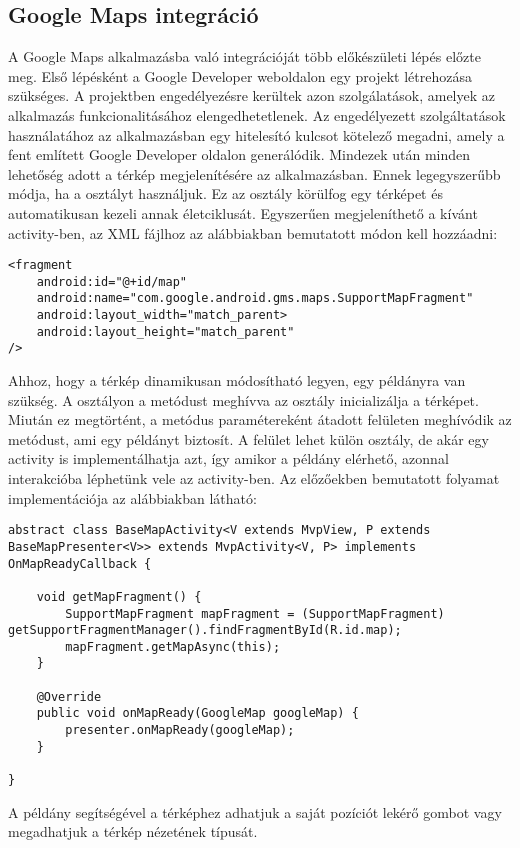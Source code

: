 \subsection*{Google Maps integráció}
\label{googlemaps}
A Google Maps alkalmazásba való integrációját több előkészületi lépés előzte meg.
Első lépésként a Google Developer weboldalon egy projekt létrehozása szükséges.
A projektben engedélyezésre kerültek azon szolgálatások, amelyek az alkalmazás funkcionalitásához elengedhetetlenek.
Az engedélyezett szolgáltatások használatához az alkalmazásban egy hitelesító kulcsot kötelező megadni, amely a fent említett Google Developer oldalon generálódik. 
Mindezek után minden lehetőség adott a térkép megjelenítésére az alkalmazásban.
Ennek legegyszerűbb módja, ha a  osztályt használjuk.
Ez az osztály körülfog egy térképet és automatikusan kezeli annak életciklusát.
Egyszerűen megjeleníthető a kívánt activity-ben, az XML fájlhoz az alábbiakban bemutatott módon kell hozzáadni:
\begin{lstlisting}
<fragment
	android:id="@+id/map"
	android:name="com.google.android.gms.maps.SupportMapFragment"
	android:layout_width="match_parent>
	android:layout_height="match_parent"
/>
\end{lstlisting}

Ahhoz, hogy a térkép dinamikusan módosítható legyen, egy  példányra van szükség.
A  osztályon a  metódust meghívva az osztály inicializálja a térképet.
Miután ez megtörtént, a metódus paramétereként átadott  felületen meghívódik az  metódust, ami egy  példányt biztosít.
A  felület lehet külön osztály, de akár egy activity is implementálhatja azt, így amikor a példány elérhető, azonnal interakcióba léphetünk vele az activity-ben.
Az előzőekben bemutatott folyamat implementációja az alábbiakban látható:
\begin{lstlisting}
abstract class BaseMapActivity<V extends MvpView, P extends BaseMapPresenter<V>> extends MvpActivity<V, P> implements OnMapReadyCallback {

    void getMapFragment() {
        SupportMapFragment mapFragment = (SupportMapFragment) getSupportFragmentManager().findFragmentById(R.id.map);
        mapFragment.getMapAsync(this);
    }

    @Override
    public void onMapReady(GoogleMap googleMap) {
        presenter.onMapReady(googleMap);
    }

}
\end{lstlisting}
A  példány segítségével a térképhez adhatjuk a saját pozíciót lekérő gombot vagy megadhatjuk a térkép nézetének típusát.

